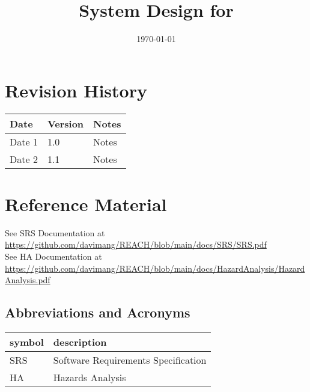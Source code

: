 \documentclass[12pt, titlepage]{article}
\begin{document}
\title{System Design for \progname{}} 
\author{\authname}
\date{\today}

\maketitle


\section{Revision History}

\begin{tabularx}{\textwidth}{p{3cm}p{2cm}X}
\toprule {\bf Date} & {\bf Version} & {\bf Notes}\\
\midrule
Date 1 & 1.0 & Notes\\
Date 2 & 1.1 & Notes\\
\bottomrule
\end{tabularx}

\newpage

\section{Reference Material}

See SRS Documentation at \url{https://github.com/davimang/REACH/blob/main/docs/SRS/SRS.pdf}\\
See HA Documentation at \url{https://github.com/davimang/REACH/blob/main/docs/HazardAnalysis/HazardAnalysis.pdf}

\subsection{Abbreviations and Acronyms}

\renewcommand{\arraystretch}{1.2}
\begin{tabular}{l l} 
  \toprule		
  \textbf{symbol} & \textbf{description}\\
  \midrule 
  SRS & Software Requirements Specification\\
  HA & Hazards Analysis\\
  \bottomrule
\end{tabular}\\

\newpage

\tableofcontents

\newpage

\listoftables

\listoffigures
\end{document}
